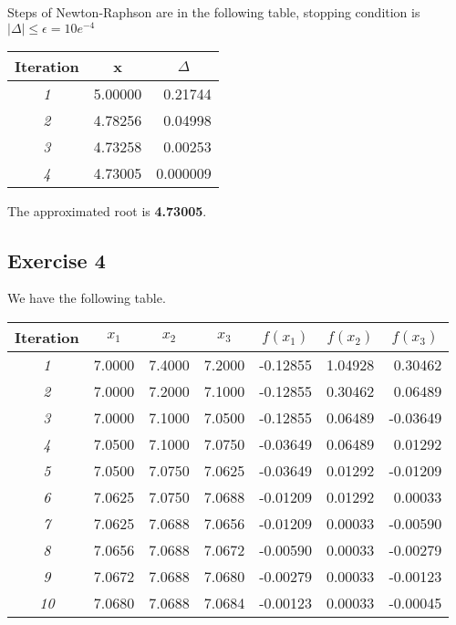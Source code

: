\documentclass[12pt]{article}
\begin{document}
Steps of Newton-Raphson are in the following table, stopping condition is $|\Delta| \leq \epsilon = 10e^{-4}$

\begin{table}[H]
\centering
\begin{tabular}{|c|r|r|}
\hline
\textbf{Iteration} & \multicolumn{1}{c|}{\textbf{x}} & \multicolumn{1}{c|}{\textbf{\(\Delta\)}} \\ \hline
\textit{1} & 5.00000 & 0.21744 \\ \hline
\textit{2} & 4.78256 & 0.04998 \\ \hline
\textit{3} & 4.73258 & 0.00253 \\ \hline
\textit{4} & 4.73005 & 0.000009 \\ \hline
\end{tabular}
\end{table}

The approximated root is  \textbf{4.73005}.

\break

\subsection{Exercise 4}

We have the following table.

\begin{table}[H]
\centering
\begin{tabular}{|c|r|r|r|r|r|r|}
\hline
\textbf{Iteration} & \multicolumn{1}{c|}{\textbf{\(x_1\)}} & \multicolumn{1}{c|}{\textbf{\(x_2\)}} & \multicolumn{1}{c|}{\textbf{\(x_3\)}} & \multicolumn{1}{c|}{\textbf{\(f(x_1)\)}} & \multicolumn{1}{c|}{\textbf{\(f(x_2)\)}} & \multicolumn{1}{c|}{\textbf{\(f(x_3)\)}} \\ \hline
\textit{1} & 7.0000 & 7.4000 & 7.2000 & -0.12855 & 1.04928 & 0.30462 \\ \hline
\textit{2} & 7.0000 & 7.2000 & 7.1000 & -0.12855 & 0.30462 & 0.06489 \\ \hline
\textit{3} & 7.0000 & 7.1000 & 7.0500 & -0.12855 & 0.06489 & -0.03649 \\ \hline
\textit{4} & 7.0500 & 7.1000 & 7.0750 & -0.03649 & 0.06489 & 0.01292 \\ \hline
\textit{5} & 7.0500 & 7.0750 & 7.0625 & -0.03649 & 0.01292 & -0.01209 \\ \hline
\textit{6} & 7.0625 & 7.0750 & 7.0688 & -0.01209 & 0.01292 & 0.00033 \\ \hline
\textit{7} & 7.0625 & 7.0688 & 7.0656 & -0.01209 & 0.00033 & -0.00590 \\ \hline
\textit{8} & 7.0656 & 7.0688 & 7.0672 & -0.00590 & 0.00033 & -0.00279 \\ \hline
\textit{9} & 7.0672 & 7.0688 & 7.0680 & -0.00279 & 0.00033 & -0.00123 \\ \hline
\textit{10} & 7.0680 & 7.0688 & 7.0684 & -0.00123 & 0.00033 & -0.00045 \\ \hline
\end{tabular}
\end{table}
\end{document}
